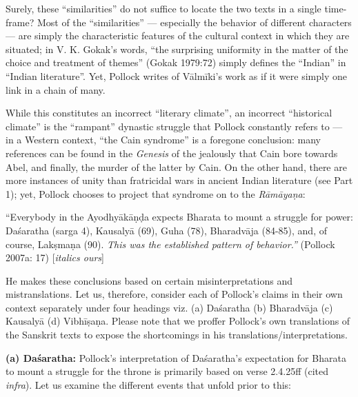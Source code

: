 Surely, these “similarities” do not suffice to locate the two texts in a single time-frame? Most of the “similarities” --- especially the behavior of different characters --- are simply the characteristic features of the cultural context in which they are situated; in V. K. Gokak’s words, “the surprising uniformity in the matter of the choice and treatment of themes” (Gokak 1979:72) simply defines the “Indian” in “Indian literature”. Yet, Pollock writes of Vālmīki’s work as if it were simply one link in a chain of many. 

While this constitutes an incorrect “literary climate”, an incorrect “historical climate” is the “rampant” dynastic struggle that Pollock constantly refers to --- in a Western context, “the Cain syndrome” is a foregone conclusion: many references can be found in the {\sl Genesis} of the jealously that Cain bore towards Abel, and finally, the murder of the latter by Cain. On the other hand, there are more instances of unity than fratricidal wars in ancient Indian literature (see Part 1); yet, Pollock chooses to project that syndrome on to the {\sl Rāmāyaṇa}: 

\begin{myquote}
“Everybody in the Ayodhyākāṇḍa expects Bharata to mount a struggle for power: Daśaratha (sarga 4), Kausalyā (69), Guha (78), Bharadvāja (84-85), and, of course, Lakṣmaṇa (90). {\sl This was the established pattern of behavior.”}  
\hfill (Pollock 2007a: 17) [{\sl italics ours}]
\end{myquote}

He makes these conclusions based on certain misinterpretations and mistranslations. Let us, therefore, consider each of Pollock’s claims in their own context separately under four headings viz. (a) Daśaratha (b) Bharadvāja (c) Kausalyā (d) Vibhīṣaṇa. Please note that we proffer Pollock’s own translations of the Sanskrit texts to expose the shortcomings in his translations/interpretations. 

\smallskip
\noindent
\textbf{(a) Daśaratha:} Pollock’s interpretation of Daśaratha’s expectation for Bharata to mount a struggle for the throne is primarily based on verse 2.4.25ff (cited {\sl infra}). Let us examine the different events that unfold prior to this: 

